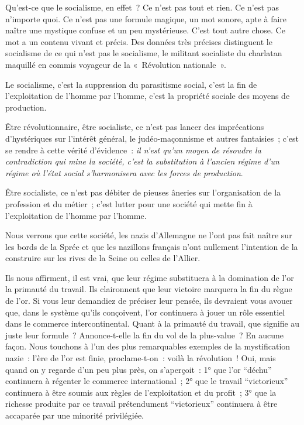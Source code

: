 \documentclass[french,twoside]{book} %
\newcommand\chaptercont{} %
\begin{document}
\chaptercont
\noindent Qu’est-ce que le socialisme, en effet ? Ce n’est pas tout et rien. Ce n’est pas n’importe quoi. Ce n’est pas une formule magique, un mot sonore, apte à faire naître une mystique confuse et un peu mystérieuse. C’est tout autre chose. Ce mot a un contenu vivant et précis. Des données très précises distinguent le socialisme de ce qui n’est pas le socialisme, le militant socialiste du charlatan maquillé en commis voyageur de la « Révolution nationale ».\par
Le socialisme, c’est la suppression du parasitisme social, c’est la fin de l’exploitation de l’homme par l’homme, c’est la propriété sociale des moyens de production.\par
Être révolutionnaire, être socialiste, ce n’est pas lancer des imprécations d’hystériques sur l’intérêt général, le judéo-maçonnisme et autres fantaisies ; c’est se rendre à cette vérité d’évidence : \emph{il n’est qu’un moyen de résoudre la contradiction qui mine la société, c’est la substitution à l’ancien régime d’un régime où l’état social s’harmonisera avec les forces de production}.\par
Être socialiste, ce n’est pas débiter de pieuses âneries sur l’organisation de la profession et du métier ; c’est lutter pour une société qui mette fin à l’exploitation de l’homme par l’homme.\par
Nous verrons que cette société, les nazis d’Allemagne ne l’ont pas fait naître sur les bords de la Sprée et que les nazillons   français n’ont nullement l’intention de la construire sur les rives de la Seine ou celles de l’Allier.\par
Ils nous affirment, il est vrai, que leur régime substituera à la domination de l’or la primauté du travail. Ils claironnent que leur victoire marquera la fin du règne de l’or. Si vous leur demandiez de préciser leur pensée, ils devraient vous avouer que, dans le système qu’ils conçoivent, l’or continuera à jouer un rôle essentiel dans le commerce intercontinental. Quant à la primauté du travail, que signifie au juste leur formule ? Annonce-t-elle la fin du vol de la plus-value ? En aucune façon. Nous touchons à l’un des plus remarquables exemples de la mystification nazie : l’ère de l’or est finie, proclame-t-on : voilà la révolution ! Oui, mais quand on y regarde d’un peu plus près, on s’aperçoit : 1° que l’or “déchu” continuera à régenter le commerce international ; 2° que le travail “victorieux” continuera à être soumis aux règles de l’exploitation et du profit ; 3° que la richesse produite par ce travail prétendument “victorieux” continuera à être accaparée par une minorité privilégiée.\par
\end{document}

